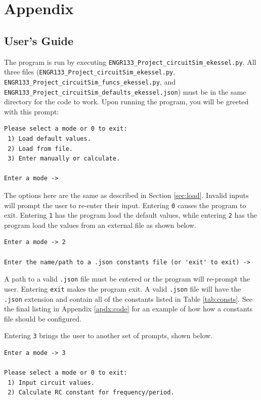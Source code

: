 \documentclass[12pt]{article}
\begin{document}
\section*{Appendix}
\begin{appendix}

\section{User's Guide}
The program is run by executing \texttt{ENGR133\_Project\_circuitSim\_ekessel.py}. All three files (\texttt{ENGR133\_Project\_circuitSim\_ekessel.py},\\ \texttt{ENGR133\_Project\_circuitSim\_funcs\_ekessel.py}, and\\ \texttt{ENGR133\_Project\_circuitSim\_defaults\_ekessel.json}) must be in the same directory for the code to work. Upon running the program, you will be greeted with this prompt:
\begin{lstlisting}[basicstyle=\ttfamily,frame=tb]
Please select a mode or 0 to exit:
 1) Load default values.
 2) Load from file.
 3) Enter manually or calculate.

Enter a mode -> 
\end{lstlisting}
The options here are the same as described in Section \ref{sec:load}. Invalid inputs will prompt the user to re-enter their input. Entering \texttt{0} causes the program to exit. Entering \texttt{1} has the program load the default values, while entering \texttt{2} has the program load the values from an external file as shown below.
\begin{lstlisting}[basicstyle=\ttfamily,frame=tb,breaklines=true]
Enter a mode -> 2

Enter the name/path to a .json constants file (or 'exit' to exit) -> 
\end{lstlisting}
A path to a valid \texttt{.json} file must be entered or the program will re-prompt the user. Entering \texttt{exit} makes the program exit. A valid \texttt{.json} file will have the \texttt{.json} extension and contain all of the constants listed in Table \ref{tab:consts}. See the final listing in Appendix \ref{apdx:code} for an example of how how a constants file should be configured.\par
Entering \texttt{3} brings the user to another set of prompts, shown below.
\begin{lstlisting}[basicstyle=\ttfamily,frame=tb,breaklines=true]
Enter a mode -> 3

Please select a mode or 0 to exit:
 1) Input circuit values.
 2) Calculate RC constant for frequency/period.


\end{lstlisting}
\end{appendix}
\end{document}
